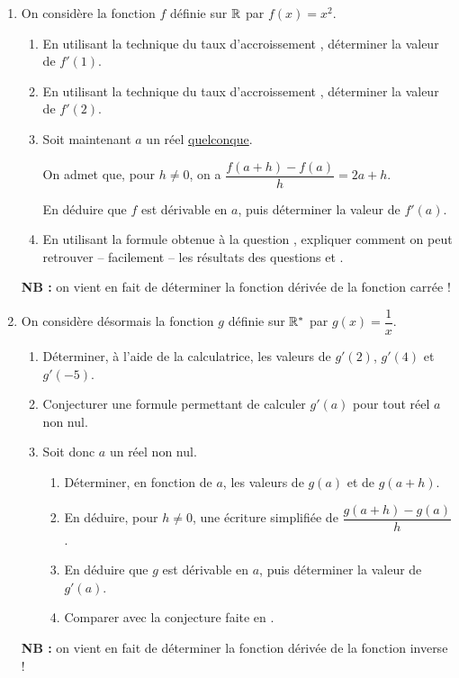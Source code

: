 \documentclass[a4paper,11pt]{article}
\begin{document}
\begin{enumerate}
	\item On considère la fonction $f$ définie sur $\R$ par $f(x)=x^2$.
	\begin{enumerate}
		\item En utilisant la technique du \og taux d'accroissement \fg{}, déterminer la valeur de $f'(1)$.
		\item En utilisant la technique du \og taux d'accroissement \fg{}, déterminer la valeur de $f'(2)$.
		\item Soit maintenant $a$ un réel \uline{quelconque}.
		
		On admet que, pour $h \neq 0$, on a $\dfrac{f(a+h)-f(a)}{h}=2a+h$.
		
		En déduire que $f$ est dérivable en $a$, puis déterminer la valeur de $f'(a)$.
		\item En utilisant la formule obtenue à la question , expliquer comment on peut retrouver -- facilement -- les résultats des questions  et .
	\end{enumerate}
	\textbf{NB : }on vient en fait de déterminer la \og fonction dérivée \fg{} de la fonction carrée !
	\item On considère désormais la fonction $g$ définie sur $\R^*$ par $g(x)=\dfrac{1}{x}$.
	\begin{enumerate}
		\item Déterminer, à l'aide de la calculatrice, les valeurs de $g'(2)$, $g'(4)$ et $g'(-5)$.
		\item Conjecturer une formule permettant de calculer $g'(a)$ pour tout réel $a$ non nul.
		\item Soit donc $a$ un réel non nul.
		\begin{enumerate}
			\item Déterminer, en fonction de $a$, les valeurs de $g(a)$ et de $g(a+h)$.
			\item En déduire, pour $h \neq 0$, une écriture simplifiée de $\dfrac{g(a+h)-g(a)}{h}$.
			\item En déduire que $g$ est dérivable en $a$, puis déterminer la valeur de $g'(a)$.
			\item Comparer avec la conjecture faite en .
		\end{enumerate}
	\end{enumerate}
	\textbf{NB : }on vient en fait de déterminer la \og fonction dérivée \fg{} de la fonction inverse !
\end{enumerate}
\end{document}
